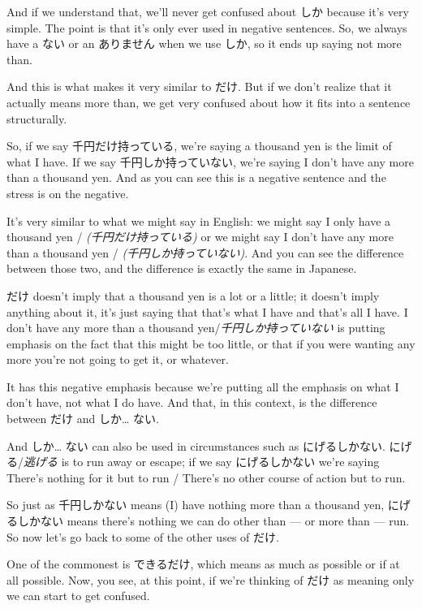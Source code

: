 And if we understand that, we'll never get confused about しか because it's very simple. The point is that it's only ever used in negative sentences. So, we always have a ない or an ありません when we use しか, so it ends up saying not more than.

And this is what makes it very similar to だけ. But if we don't realize that it actually means more than, we get very confused about how it fits into a sentence structurally.

So, if we say 千円だけ持っている, we're saying a thousand yen is the limit of what I have. If we say 千円しか持っていない, we're saying I don't have any more than a thousand yen. And as you can see this is a negative sentence and the stress is on the negative.

It's very similar to what we might say in English: we might say I only have a thousand yen / {\em (千円だけ持っている)} or we might say I don't have any more than a thousand yen / {\em (千円しか持っていない)}. And you can see the difference between those two, and the difference is exactly the same in Japanese.

だけ doesn't imply that a thousand yen is a lot or a little; it doesn't imply anything about it, it's just saying that that's what I have and that's all I have. I don't have any more than a thousand yen/{\em 千円しか持っていない} is putting emphasis on the fact that this might be too little, or that if you were wanting any more you're not going to get it, or whatever.

It has this negative emphasis because we're putting all the emphasis on what I don't have, not what I do have. And that, in this context, is the difference between だけ and しか\ldots{} ない.

And しか\ldots{} ない can also be used in circumstances such as にげるしかない. にげる/{\em 逃げる} is to run away or escape; if we say にげるしかない we're saying There's nothing for it but to run / There's no other course of action but to run.

So just as 千円しかない means (I) have nothing more than a thousand yen, にげるしかない means there's nothing we can do other than --- or more than --- run. So now let's go back to some of the other uses of だけ.

\stopsectionlevel

\startsectionlevel[title={Other uses of だけ},reference={other-uses-of-だけ}]

One of the commonest is できるだけ, which means as much as possible or if at all possible. Now, you see, at this point, if we're thinking of だけ as meaning only we can start to get confused.

